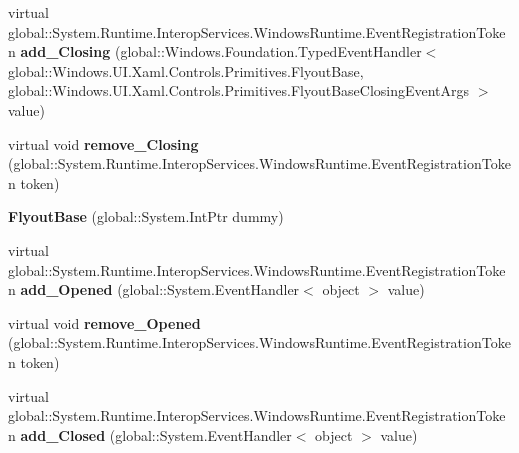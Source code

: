 \begin{DoxyCompactItemize}
virtual global\+::\+System.\+Runtime.\+Interop\+Services.\+Windows\+Runtime.\+Event\+Registration\+Token {\bfseries add\+\_\+\+Closing} (global\+::\+Windows.\+Foundation.\+Typed\+Event\+Handler$<$ global\+::\+Windows.\+U\+I.\+Xaml.\+Controls.\+Primitives.\+Flyout\+Base, global\+::\+Windows.\+U\+I.\+Xaml.\+Controls.\+Primitives.\+Flyout\+Base\+Closing\+Event\+Args $>$ value)
\item 
\mbox{\label{class_windows_1_1_u_i_1_1_xaml_1_1_controls_1_1_primitives_1_1_flyout_base_a3d2a27eaf9daaa9e54e906ae772bc53b}} 
virtual void {\bfseries remove\+\_\+\+Closing} (global\+::\+System.\+Runtime.\+Interop\+Services.\+Windows\+Runtime.\+Event\+Registration\+Token token)
\item 
\mbox{\label{class_windows_1_1_u_i_1_1_xaml_1_1_controls_1_1_primitives_1_1_flyout_base_aa5806d40967d26c2011e0427640dd885}} 
{\bfseries Flyout\+Base} (global\+::\+System.\+Int\+Ptr dummy)
\item 
\mbox{\label{class_windows_1_1_u_i_1_1_xaml_1_1_controls_1_1_primitives_1_1_flyout_base_a897348c50b44a1e97d0d95c49c1bd853}} 
virtual global\+::\+System.\+Runtime.\+Interop\+Services.\+Windows\+Runtime.\+Event\+Registration\+Token {\bfseries add\+\_\+\+Opened} (global\+::\+System.\+Event\+Handler$<$ object $>$ value)
\item 
\mbox{\label{class_windows_1_1_u_i_1_1_xaml_1_1_controls_1_1_primitives_1_1_flyout_base_a4bd2f94eb6ae77227752ea52d9497eb1}} 
virtual void {\bfseries remove\+\_\+\+Opened} (global\+::\+System.\+Runtime.\+Interop\+Services.\+Windows\+Runtime.\+Event\+Registration\+Token token)
\item 
\mbox{\label{class_windows_1_1_u_i_1_1_xaml_1_1_controls_1_1_primitives_1_1_flyout_base_a5f48a350689b2ef057ac2a870cfbbc9f}} 
virtual global\+::\+System.\+Runtime.\+Interop\+Services.\+Windows\+Runtime.\+Event\+Registration\+Token {\bfseries add\+\_\+\+Closed} (global\+::\+System.\+Event\+Handler$<$ object $>$ value)
\item 

\end{DoxyCompactItemize}
